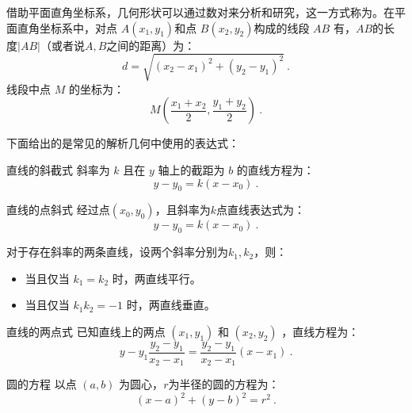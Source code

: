 借助平面直角坐标系，几何形状可以通过数对来分析和研究，这一方式称为。在平面直角坐标系中，对点 $A(x_1, y_1)$和点  $B(x_2, y_2) $构成的线段  $AB$  有，$AB$的长度$|AB|$（或者说$A,B$之间的距离）为：
\begin{equation}
d = \sqrt{(x_2 - x_1)^2 + (y_2 - y_1)^2}~.
\end{equation}
线段中点  $M$  的坐标为：
\begin{equation}
M \left( \frac{x_1 + x_2}{2}, \frac{y_1 + y_2}{2} \right)~.
\end{equation}

下面给出的是常见的解析几何中使用的表达式：

\begin{definition}{直线的斜截式}
斜率为  $k$  且在 $y$ 轴上的截距为  $b$  的直线方程为：
\begin{equation}
y-y_0=k(x-x_0)~.
\end{equation}
\end{definition}

\begin{definition}{直线的点斜式}\label{def_HsGeBa_1}
经过点$(x_0,y_0)$，且斜率为$k$点直线表达式为：
\begin{equation}
y-y_0=k(x-x_0)~.
\end{equation}
\end{definition}

对于存在斜率的两条直线，设两个斜率分别为$k_1,k_2$，则：
\begin{itemize}
\item 当且仅当  $k_1 = k_2 $ 时，两直线平行。
\item 当且仅当  $k_1 k_2 = -1$  时，两直线垂直。
\end{itemize}

\begin{definition}{直线的两点式}
已知直线上的两点  $(x_1, y_1)$  和  $(x_2, y_2)$  ，直线方程为：
\begin{equation}
y - y_1 \frac{y_2 - y_1}{x_2 - x_1} = \frac{y_2 - y_1}{x_2 - x_1} (x - x_1)~.
\end{equation}
\end{definition}

\begin{definition}{圆的方程}
以点  $(a, b)$  为圆心，$r$为半径的圆的方程为：
\begin{equation}
(x - a)^2 + (y - b)^2 = r^2~.
\end{equation}
\end{definition}


